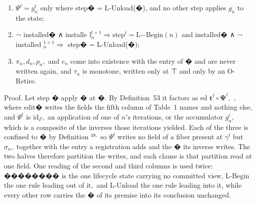 \documentclass[
  10
]{article}
\begin{document}
\begin{enumerate}
\def\labelenumi{\arabic{enumi}.}
\setcounter{enumi}{2}
\item
  \(\Psi ^ { t } = g _ { n } ^ { t }\) only where step� = L-Unload(�),
  and no other step applies \(g _ { n }\) to the state;
\item
  ¬ installed� ∧ installe
  \(\mathrm { l } _ { n } ^ { t + 1 } \Rightarrow \mathrm { s t e p } ^ { t } = \mathrm { L } \mathrm { - B e g i n } ( n )\)
  and installed� ∧ ¬ installed \(^ { 1 + 1 } _ { n } \Rightarrow\) step�
  = L-Unload(�);
\item
  \(\pi _ { n } , d _ { n } , p _ { n } ,\) and \(e _ { n }\) come into
  existence with the entry of � and are never written again, and
  \(\tau _ { n }\) is monotone, written only at ⊤ and only by an
  O-Retire.
\end{enumerate}

Proof. Let step � apply � at �. By Definition~53 it factors as ed
\(\mathbf { \boldsymbol { t } } ^ { t } \circ \boldsymbol { \Psi } ^ { t } ,\)
, where edit� writes the fields the fifth column of Table~1 names and
nothing else, and \(\Psi ^ { t }\) is
\({ \mathrm { i d } } _ { \Gamma } ,\) an application of one of
\(n \mathrm { { ' s } }\) iterations, or the accumulator
\(g _ { n } ^ { t } ,\) which is a composite of the inverses those
iterations yielded. Each of the three is confined to � by Definition
\(^ { 4 8 , }\) so \(\Psi ^ { t }\) writes no field of a fiber present
at \(\gamma ^ { t }\) but \(\sigma _ { n } ,\) together with the entry a
registration adds and the � its inverse writes. The two halves therefore
partition the writes, and each clause is that partition read at one
field. One reading of the second and third columns is used twice:
�������� is the one lifecycle state carrying no committed view, L-Begin
the one rule leading out of \({ \mathrm { i t } } ,\) and L-Unload the
one rule leading into it, while every other row carries the � of its
premise into its conclusion unchanged.
\end{document}
